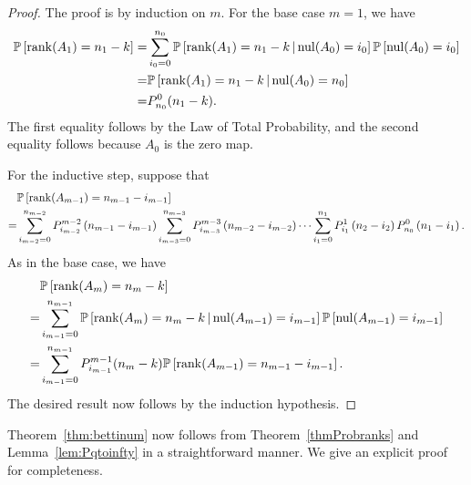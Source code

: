 \begin{proof}
The proof is by induction on $m$. For the base case $m=1$, we have
\begin{align*}
\mathbb{P}\left[\operatorname{\mathrm{rank}}(A_1) = n_1 - k\right]
	=& \sum_{i_0=0}^{n_0}\mathbb{P}\left [\operatorname{\mathrm{rank}}(A_1)= n_1 - k\,|\,\mathrm{nul} (A_0) = i_0\right]
		\mathbb{P}\left[\mathrm{nul}(A_0) = i_0 \right]\\
	=& \mathbb{P}\left [\operatorname{\mathrm{rank}}(A_1)= n_1 - k\,|\,\mathrm{nul} (A_0) = n_0\right]\\
	=& P_{n_0}^0(n_1 - k).
\end{align*}
The first equality follows by the Law of Total Probability, and the second equality follows because $A_0$ is the zero map.

For the inductive step, suppose that
\begin{align*}
 &  \mathbb{P}\left[\operatorname{\mathrm{rank}}(A_{m-1}) = n_{m-1} - i_{m-1}\right]\\
=& 	\sum_{i_{m-2}=0}^{n_{m-2}} P_{i_{m-2}}^{m-2}\left(n_{m-1} -i_{m-1}\right)
	\sum_{i_{m-3}=0}^{n_{m-3}} P_{i_{m-3}}^{m-3}\left(n_{m-2} - i_{m-2}\right)
		\cdots
	\sum_{i_1 = 0}^{n_1} P_{i_1}^1\left(n_2 - i_2\right) P_{n_0}^0 \left(n_1 - i_1\right).
\end{align*}
As in the base case, we have 
\begin{align*}
   & \mathbb{P}\left[\operatorname{\mathrm{rank}}(A_{m}) = n_{m} - k\right]\\
  =& \sum_{i_{m-1}=0}^{n_{m-1}} \mathbb{P}\left[ \operatorname{\mathrm{rank}}(A_{m}) = n_{m} - k  
  		\,|\, \mathrm{nul}(A_{m-1}) = i_{m-1}\right] \mathbb{P}\left[\mathrm{nul}(A_{m-1}) = i_{m-1}\right]\\
  =& \sum_{i_{m-1}=0}^{n_{m-1}} P_{i_{m-1}}^{m-1}(n_{m} - k)
  		\mathbb{P}\left[\operatorname{\mathrm{rank}}(A_{m-1}) = n_{m-1}- i_{m-1}\right].
\end{align*}
The desired result now follows by the induction hypothesis.
\end{proof}

Theorem~\ref{thm:bettinum} now follows from Theorem~\ref{thmProbranks} and 
Lemma~\ref{lem:Pqtoinfty} in a straightforward manner. We give an explicit proof
for completeness.

